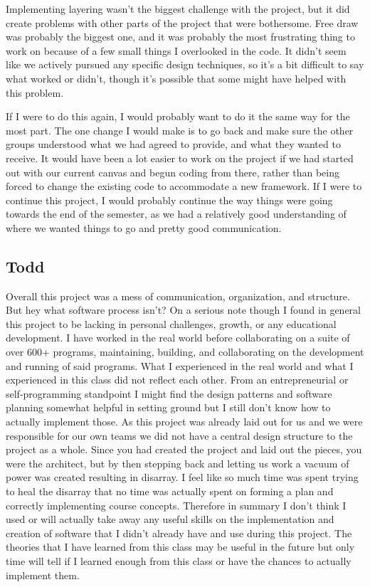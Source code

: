\documentclass[a4paper, 11pt]{article} %
\begin{document}
Implementing layering wasn’t the biggest challenge with the project, but it did create problems with other parts of the project that were bothersome. Free draw was probably the biggest one, and it was probably the most frustrating thing to work on because of a few small things I overlooked in the code. It didn’t seem like we actively pursued any specific design techniques, so it’s a bit difficult to say what worked or didn’t, though it’s possible that some might have helped with this problem.

If I were to do this again, I would probably want to do it the same way for the most part. The one change I would make is to go back and make sure the other groups understood what we had agreed to provide, and what they wanted to receive. It would have been a lot easier to work on the project if we had started out with our current canvas and begun coding from there, rather than being forced to change the existing code to accommodate a new framework. If I were to continue this project, I would probably continue the way things were going towards the end of the semester, as we had a relatively good understanding of where we wanted things to go and pretty good communication.

\subsection{Todd}
Overall this project was a mess of communication, organization, and structure. But hey what software process isn’t? On a serious note though I found in general this project to be lacking in personal challenges, growth, or any educational development. I have worked in the real world before collaborating on a suite of over 600+ programs, maintaining, building, and collaborating on the development and running of said programs. What I experienced in the real world and what I experienced in this class did not reflect each other. From an entrepreneurial or self-programming standpoint I might find the design patterns and software planning somewhat helpful in setting ground but I still don’t know how to actually implement those. As this project was already laid out for us and we were responsible for our own teams we did not have a central design structure to the project as a whole. Since you had created the project and laid out the pieces, you were the architect, but by then stepping back and letting us work a vacuum of power was created resulting in disarray. I feel like so much time was spent trying to heal the disarray that no time was actually spent on forming a plan and correctly implementing course concepts. Therefore in summary I don’t think I used or will actually take away any useful skills on the implementation and creation of software that I didn’t already have and use during this project. The theories that I have learned from this class may be useful in the future but only time will tell if I learned enough from this class or have the chances to actually implement them. 
\end{document}
